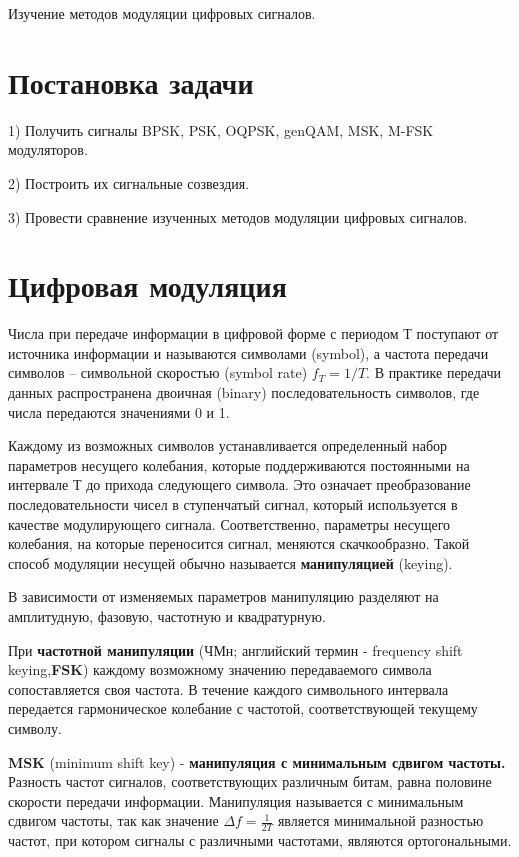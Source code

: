 \documentclass[12pt,a4paper]{scrartcl}
\begin{document}
Изучение методов модуляции цифровых сигналов.\\

\section{Постановка задачи}
\label{sec:task}

1) Получить сигналы BPSK, PSK, OQPSK, genQAM, MSK, M-FSK модуляторов.

2) Построить их сигнальные созвездия.

3) Провести сравнение изученных методов модуляции цифровых сигналов.

\clearpage
\newpage

\section{Цифровая модуляция}
\label{sec:teoriya}

Числа при передаче информации в цифровой форме с периодом Т поступают от источника информации и называются символами (symbol), а частота передачи символов – символьной скоростью (symbol rate) $f_T = 1/T$. В практике передачи данных распространена двоичная (binary) последовательность символов, где числа передаются значениями 0 и 1.


Каждому из возможных символов устанавливается определенный набор параметров несущего колебания, которые поддерживаются постоянными на интервале Т до прихода следующего символа. Это означает преобразование последовательности чисел в ступенчатый сигнал, который используется в качестве модулирующего сигнала. Соответственно, параметры несущего колебания, на которые переносится сигнал, меняются скачкообразно. Такой способ модуляции несущей обычно называется \textbf{манипуляцией} (keying).

В зависимости от изменяемых параметров манипуляцию разделяют на амплитудную, фазовую, частотную и квадратурную.

При \textbf{частотной манипуляции} (ЧМн; английский термин - frequency shift keying,\textbf{FSK}) каждому возможному значению передаваемого символа сопоставляется своя частота. В течение каждого символьного интервала передается гармоническое колебание с частотой, соответствующей текущему символу.

\textbf{MSK} (minimum shift key) - \textbf{манипуляция с минимальным сдвигом частоты.} Разность частот сигналов, соответствующих различным битам, равна половине скорости передачи информации. Манипуляция называется с минимальным сдвигом частоты, так как значение $\Delta f = \frac{1}{2T}$ является минимальной разностью частот, при котором сигналы с различными частотами, являются ортогональными. 
\end{document}
